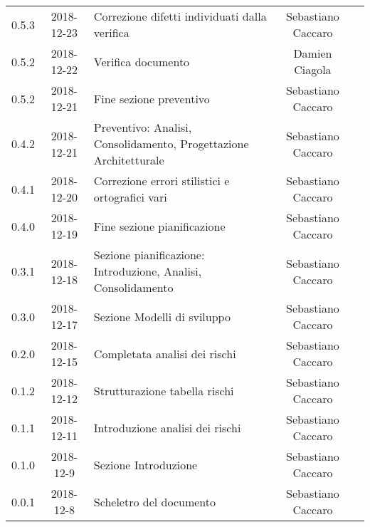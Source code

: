 {\begin{longtable}{ c c  C{4cm}  c  c }
		0.5.3 & 2018-12-23 & Correzione difetti individuati dalla verifica & Sebastiano Caccaro & \reda{}\\		
		
		0.5.2 & 2018-12-22 & Verifica documento & Damien Ciagola & \ver{}\\
		
		0.5.2 & 2018-12-21 & Fine sezione preventivo & Sebastiano Caccaro & \reda{}\\
		
		0.4.2 & 2018-12-21 & Preventivo: Analisi, Consolidamento, Progettazione Architetturale & Sebastiano Caccaro & \reda{}\\
		
		0.4.1 & 2018-12-20 & Correzione errori stilistici e ortografici vari & Sebastiano Caccaro & \reda{}\\
		
		0.4.0 & 2018-12-19 & Fine sezione pianificazione & Sebastiano Caccaro & \reda{}\\
		
		0.3.1 & 2018-12-18 & Sezione pianificazione: Introduzione, Analisi, Consolidamento & Sebastiano Caccaro & \reda{}\\
		
		0.3.0 & 2018-12-17 & Sezione Modelli di sviluppo & Sebastiano Caccaro & \reda{}\\
				
		0.2.0 & 2018-12-15 & Completata analisi dei rischi & Sebastiano Caccaro & \reda{}\\
				
		0.1.2 & 2018-12-12 & Strutturazione tabella rischi & Sebastiano Caccaro & \reda{}\\
				
		0.1.1 & 2018-12-11 & Introduzione analisi dei rischi & Sebastiano Caccaro & \reda{}\\
				
		0.1.0 & 2018-12-9 & Sezione Introduzione & Sebastiano Caccaro & \reda{}\\
		
		0.0.1 & 2018-12-8 & Scheletro del documento & Sebastiano Caccaro & \reda{}\\
		
	\end{longtable}

}